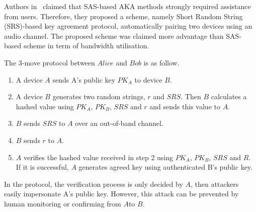 Authors in~\cite{5678019} claimed that SAS-based AKA methods strongly required assistance from users. Therefore, they proposed a scheme, namely Short Random String (SRS)-based key agreement protocol, automatically pairing two devices using an audio channel. The proposed scheme was claimed more advantage than SAS-based scheme in term of bandwidth utilisation. 

The 3-move protocol between $Alice$ and $Bob$ is as follow.
\begin{enumerate}
\item A device $A$ sends A's public key $PK_A$ to device $B$.
\item A device $B$ generates two random strings, $r$ and $SRS$. Then $B$ calculates a hashed value using $PK_A$, $PK_B$, $SRS$ and $r$ and sends this value to $A$.
\item $B$ sends $SRS$ to $A$ over an out-of-band channel. 
\item $B$ sends $r$ to $A$.
\item $A$ verifies the hashed value received in step 2 using $PK_A$, $PK_B$, $SRS$ and $R$. If it is successful, $A$ generates agreed key using authenticated B's public key. 
\end{enumerate}

In the protocol, the verification process is only decided by $A$, then attackers easily impersonate A's public key. However, this attack can be prevented by human monitoring or confirming from $A$to $B$. 

\begin{center}
\end{center} 

